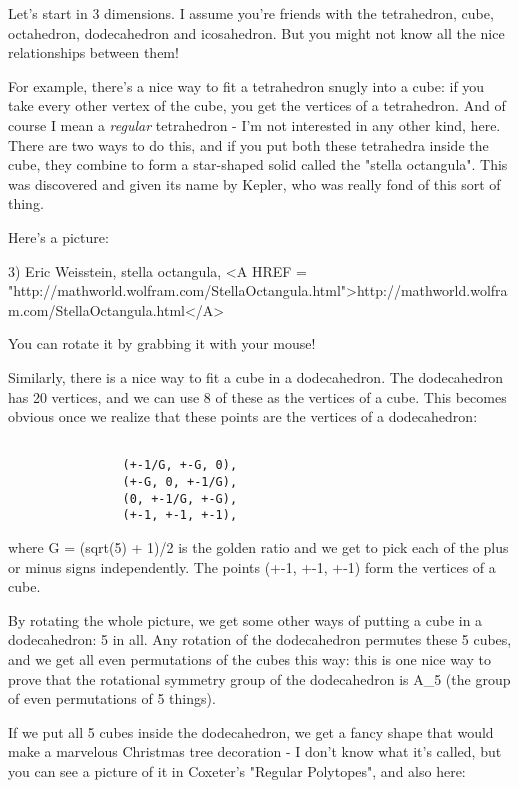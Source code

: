 Let's start in 3 dimensions.  I assume you're friends with the
tetrahedron, cube, octahedron, dodecahedron and icosahedron.  But you
might not know all the nice relationships between them!  

For example, there's a nice way to fit a tetrahedron snugly into a cube:
if you take every other vertex of the cube, you get the vertices of a
tetrahedron.  And of course I mean a \emph{regular} tetrahedron - I'm not
interested in any other kind, here.  There are two ways to do this, and
if you put both these tetrahedra inside the cube, they combine to form a
star-shaped solid called the "stella octangula".  This was
discovered and given its name by Kepler, who was really fond of this
sort of thing.

Here's a picture:

3) Eric Weisstein, stella octangula, 
<A HREF = "http://mathworld.wolfram.com/StellaOctangula.html">http://mathworld.wolfram.com/StellaOctangula.html</A>

You can rotate it by grabbing it with your mouse!

Similarly, there is a nice way to fit a cube in a dodecahedron.  The
dodecahedron has 20 vertices, and we can use 8 of these as the vertices
of a cube.  This becomes obvious once we realize that these points are
the vertices of a dodecahedron:


\begin{verbatim}

                (+-1/G, +-G, 0),
                (+-G, 0, +-1/G),
                (0, +-1/G, +-G),
                (+-1, +-1, +-1),
\end{verbatim}
    
where G = (sqrt(5) + 1)/2 is the golden ratio and we get to pick each of
the plus or minus signs independently.  The points (+-1, +-1, +-1) form
the vertices of a cube.  

By rotating the whole picture, we get some other ways of putting a cube
in a dodecahedron: 5 in all.  Any rotation of the dodecahedron permutes
these 5 cubes, and we get all even permutations of the cubes this way:
this is one nice way to prove that the rotational symmetry group of the
dodecahedron is A_{5} (the group of even permutations of 5 things).

If we put all 5 cubes inside the dodecahedron, we get a fancy shape
that would make a marvelous Christmas tree decoration - I don't know 
what it's called, but you can see a picture of it in Coxeter's "Regular
Polytopes", and also here:

